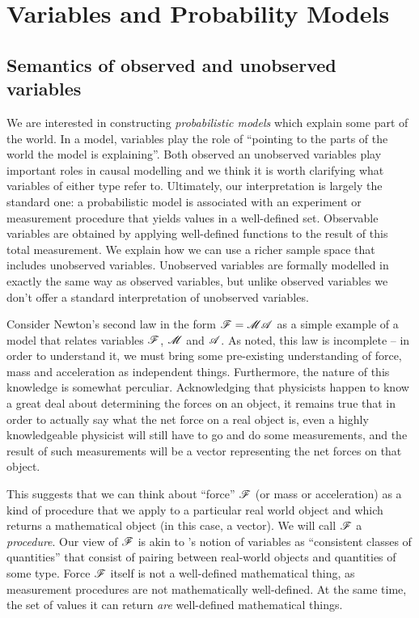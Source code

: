 

\section{Variables and Probability Models}\label{sec:vague_variables}

\subsection{Semantics of observed and unobserved variables}\label{sec:variables}

We are interested in constructing \emph{probabilistic models} which explain some part of the world. In a model, variables play the role of ``pointing to the parts of the world the model is explaining''. Both observed an unobserved variables play important roles in causal modelling and we think it is worth clarifying what variables of either type refer to. Ultimately, our interpretation is largely the standard one: a probabilistic model is associated with an experiment or measurement procedure that yields values in a well-defined set. Observable variables are obtained by applying well-defined functions to the result of this total measurement. We explain how we can use a richer sample space that includes unobserved variables. Unobserved variables are formally modelled in exactly the same way as observed variables, but unlike observed variables we don't offer a standard interpretation of unobserved variables. 

Consider Newton's second law in the form $\mathscr{F}=\mathscr{MA}$ as a simple example of a model that relates variables $\mathscr{F}$, $\mathscr{M}$ and $\mathscr{A}$. As \citet{feynman_feynman_1979} noted, this law is incomplete -- in order to understand it, we must bring some pre-existing understanding of force, mass and acceleration as independent things. Furthermore, the nature of this knowledge is somewhat perculiar. Acknowledging that physicists happen to know a great deal about determining the forces on an object, it remains true that in order to actually say what the net force on a real object is, even a highly knowledgeable physicist will still have to go and do some measurements, and the result of such measurements will be a vector representing the net forces on that object.

This suggests that we can think about ``force'' $\mathscr{F}$ (or mass or acceleration) as a kind of procedure that we apply to a particular real world object and which returns a mathematical object (in this case, a vector). We will call $\mathscr{F}$ a \emph{procedure}. Our view of $\mathscr{F}$ is akin to \citet{menger_random_2003}'s notion of variables as ``consistent classes of quantities'' that consist of pairing between real-world objects and quantities of some type. Force $\mathscr{F}$ itself is not a well-defined mathematical thing, as measurement procedures are not mathematically well-defined. At the same time, the set of values it can return \emph{are} well-defined mathematical things. 

